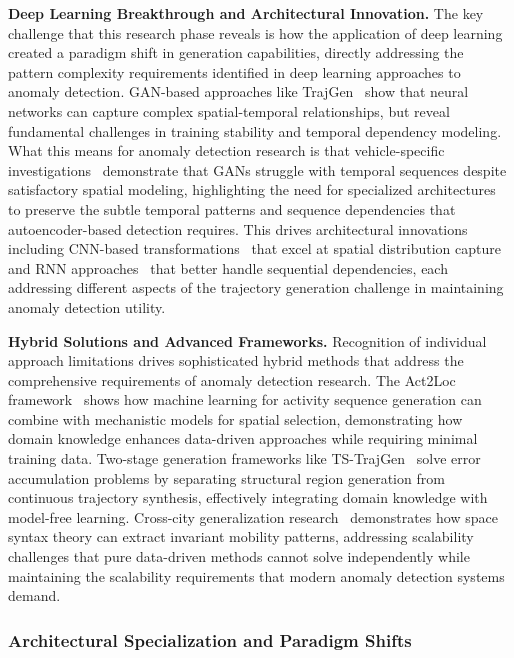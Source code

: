 \documentclass[runningheads]{llncs}
\begin{document}
\textbf{Deep Learning Breakthrough and Architectural Innovation.} The key challenge that this research phase reveals is how the application of deep learning created a paradigm shift in generation capabilities, directly addressing the pattern complexity requirements identified in deep learning approaches to anomaly detection. GAN-based approaches like TrajGen~\cite{cao2021generating} show that neural networks can capture complex spatial-temporal relationships, but reveal fundamental challenges in training stability and temporal dependency modeling. What this means for anomaly detection research is that vehicle-specific investigations~\cite{bajarunas2022generative} demonstrate that GANs struggle with temporal sequences despite satisfactory spatial modeling, highlighting the need for specialized architectures to preserve the subtle temporal patterns and sequence dependencies that autoencoder-based detection requires. This drives architectural innovations including CNN-based transformations~\cite{merhi2024synthetic} that excel at spatial distribution capture and RNN approaches~\cite{du2016recurrent} that better handle sequential dependencies, each addressing different aspects of the trajectory generation challenge in maintaining anomaly detection utility.

\textbf{Hybrid Solutions and Advanced Frameworks.} Recognition of individual approach limitations drives sophisticated hybrid methods that address the comprehensive requirements of anomaly detection research. The Act2Loc framework~\cite{liu2023act2loc} shows how machine learning for activity sequence generation can combine with mechanistic models for spatial selection, demonstrating how domain knowledge enhances data-driven approaches while requiring minimal training data. Two-stage generation frameworks like TS-TrajGen~\cite{jiang2023continuous} solve error accumulation problems by separating structural region generation from continuous trajectory synthesis, effectively integrating domain knowledge with model-free learning. Cross-city generalization research~\cite{wang2025gtg} demonstrates how space syntax theory can extract invariant mobility patterns, addressing scalability challenges that pure data-driven methods cannot solve independently while maintaining the scalability requirements that modern anomaly detection systems demand.

\subsubsection{Architectural Specialization and Paradigm Shifts}
\end{document}
